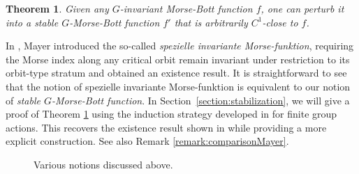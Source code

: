 \documentclass[11pt]{amsart}
\newtheorem{theorem}{Theorem}[section]
\theoremstyle{definition}
\numberwithin{equation}{subsection}
\begin{document}
\begin{theorem}\label{thm:stabilization}
    Given any $G$-invariant Morse-Bott function $f$, one can perturb it into a stable $G$-Morse-Bott function $f'$ that is arbitrarily $C^1$-close to $f$.
\end{theorem} 

  In \cite{mayer1989Ginvariant}, Mayer introduced the so-called \emph{spezielle invariante Morse-funktion}, requiring the Morse index along any critical orbit remain  invariant under restriction to its orbit-type stratum and obtained an existence result. It is straightforward to see that the notion of spezielle invariante Morse-funktion is equivalent to our notion of \emph{stable $G$-Morse-Bott function}. In Section~\ref{section:stabilization}, we will give a proof of Theorem \ref{thm:stabilization} using the induction strategy developed in \cite{bao2024morse} for finite group actions. This recovers the existence result shown in \cite{mayer1989Ginvariant} while providing a more explicit construction. See also Remark \ref{remark:comparisonMayer}.

\begin{figure}
    \centering
    \caption{Various notions discussed above.}
    \label{fig:notions}
\end{figure}
    
\end{document}
